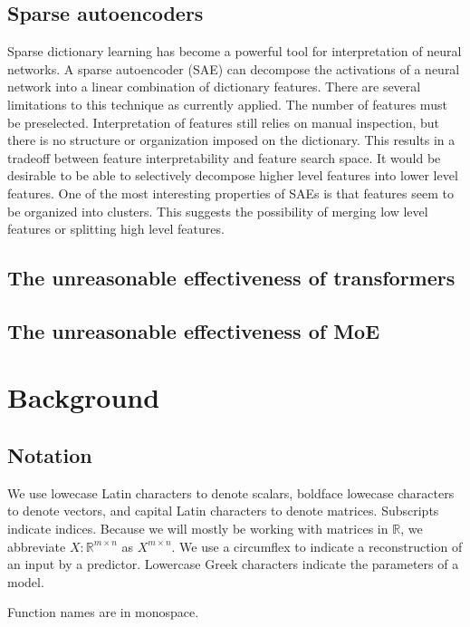 \subsection{Sparse autoencoders}
Sparse dictionary learning has become a powerful tool for interpretation of neural networks. 
A sparse autoencoder (SAE) can decompose the activations of a neural network into a linear combination of dictionary features\cite{cunningham2023sparse}.
There are several limitations to this technique as currently applied.
The number of features must be preselected.
Interpretation of features still relies on manual inspection,
but there is no structure or organization imposed on the dictionary.
This results in a tradeoff between feature interpretability and feature search space. 
It would be desirable to be able to selectively decompose higher level features into lower level features.
One of the most interesting properties of SAEs is that features seem to be organized into clusters\cite{bricken2023monosemanticity}.
This suggests the possibility of merging low level features or splitting high level features.

\subsection{The unreasonable effectiveness of transformers}

\subsection{The unreasonable effectiveness of MoE}

\section{Background}

\subsection{Notation}
We use lowecase Latin characters to denote scalars, boldface lowecase characters to denote vectors, and capital Latin characters to denote matrices.
Subscripts indicate indices.
Because we will mostly be working with matrices in $\mathbb{R}$, we abbreviate $X : \mathbb{R}^{m \times n}$ as $X^{m \times n}$.
We use a circumflex to indicate a reconstruction of an input by a predictor.
Lowercase Greek characters indicate the parameters of a model.

Function names are in monospace.

